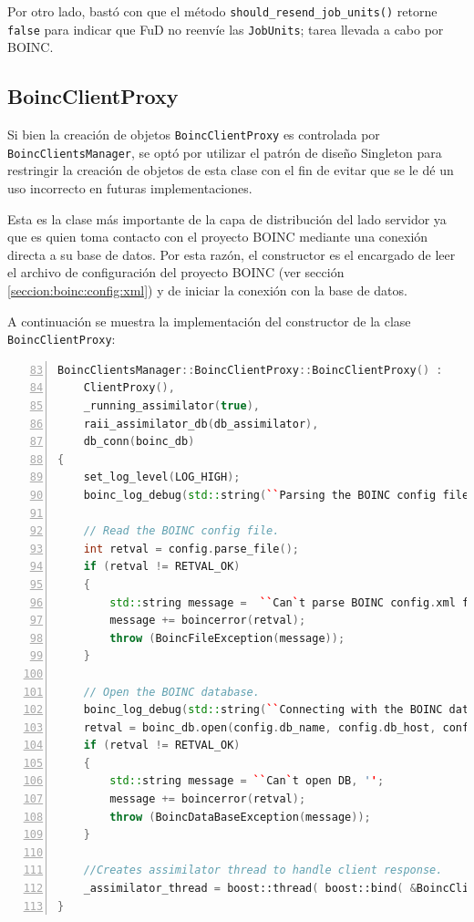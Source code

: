 Por otro lado, bastó con que el método \texttt{should\_resend\_job\_units()} retorne \texttt{false} para indicar que FuD no reenvíe las \texttt{JobUnits}; tarea llevada a cabo por BOINC.
	
	\subsection{BoincClientProxy}
Si bien la creación de objetos \texttt{BoincClientProxy} es controlada por \texttt{BoincClientsManager}, se optó por utilizar el patrón de diseño Singleton para \linebreak restringir la creación de objetos de esta clase con el fin de evitar que se le dé un uso incorrecto en futuras implementaciones.

Esta es la clase más importante de la capa de distribución del lado servidor ya que es quien toma contacto con el proyecto BOINC mediante una conexión directa a su base de datos. Por esta razón, el constructor es el encargado de leer el archivo de configuración del proyecto BOINC (ver sección \ref{seccion:boinc:config:xml}) y de iniciar la conexión con la base de datos.

A continuación se muestra la implementación del constructor de la clase \texttt{BoincClientProxy}:

\begin{lstlisting}[frame=shadowbox, language=C++, numbers=left, xleftmargin=8mm, framexleftmargin=22pt, basicstyle=\scriptsize, numberstyle=\footnotesize, breaklines=true, breakatwhitespace=false, captionpos=b, caption={Constructor \texttt{BoincClientProxy}}, label=listing:BoincClientProxy, backgroundcolor=\color{gris}, firstnumber=83, keywordstyle=\color{Blue}]
BoincClientsManager::BoincClientProxy::BoincClientProxy() :
    ClientProxy(),
    _running_assimilator(true),
    raii_assimilator_db(db_assimilator),
    db_conn(boinc_db)
{
    set_log_level(LOG_HIGH);
    boinc_log_debug(std::string(``Parsing the BOINC config file.''));
    
    // Read the BOINC config file.
    int retval = config.parse_file();
    if (retval != RETVAL_OK)
    {
        std::string message =  ``Can`t parse BOINC config.xml file, '';
        message += boincerror(retval);
        throw (BoincFileException(message));
    }

    // Open the BOINC database.
    boinc_log_debug(std::string(``Connecting with the BOINC database.''));
    retval = boinc_db.open(config.db_name, config.db_host, config.db_user, config.db_passwd);
    if (retval != RETVAL_OK)
    {
        std::string message = ``Can`t open DB, '';
        message += boincerror(retval);
        throw (BoincDataBaseException(message));
    }

    //Creates assimilator thread to handle client response.
    _assimilator_thread = boost::thread( boost::bind( &BoincClientProxy::assimilator_thread, this ) );
}
\end{lstlisting}

